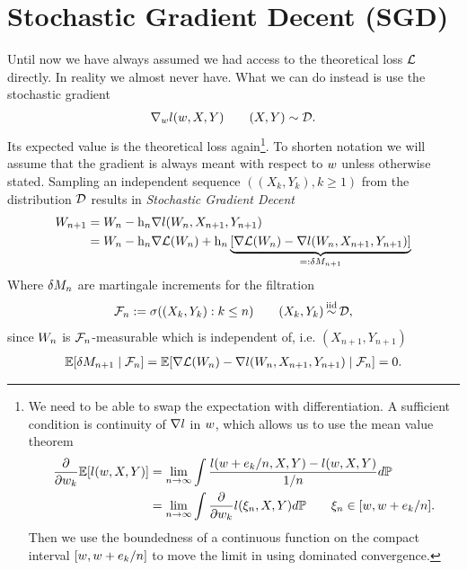 
\chapter{Stochastic Gradient Decent (SGD)}

Until now we have always assumed we had access to the theoretical loss \(\mathcal{L}\) 
directly. In reality we almost never have. What we can do instead is use the
stochastic gradient
%
\begin{align*}
	\nabla_wl (w, X,Y) \qquad (X,Y)\sim\mathcal{D}.
\end{align*}
%
Its expected value is the theoretical loss again\footnote{
	We need to be able to swap the expectation with differentiation. A sufficient 
	condition is continuity of \(\nabla l\) in \(w\), which allows us
	to use the mean value theorem
	\begin{align*}
		\frac{\partial}{\partial w_k}\mathbb{E}[l(w, X,Y)]
		&= \lim_{n\to\infty}
		\int\frac{l(w+e_k/n, X,Y)-l(w,X,Y)}{1/n}d\mathbb{P}
		\\
		&=\lim_{n\to\infty} \int\frac{\partial}{\partial w_k}l(\xi_n, X,Y)d\mathbb{P}
		\qquad \xi_n \in [w, w + e_k/n].
	\end{align*}
	Then we use the boundedness of a continuous function on the compact interval
	\([w, w + e_k/n]\) to move the limit in using
	dominated convergence.
}. To shorten notation we will assume that the gradient is always meant
with respect to \(w\) unless otherwise stated.
Sampling an independent sequence \(((X_k,Y_k), k\ge 1)\) from the 
distribution \(\mathcal{D}\) results in \emph{Stochastic Gradient Decent}
%
\begin{align*}
	W_{n+1}
	&= W_n - \text{h}_n\nabla l(W_n, X_{n+1},Y_{n+1})\\
	&= W_n - \text{h}_n\nabla\mathcal{L}(W_n)
	+ \text{h}_n\underbrace{
		[\nabla\mathcal{L}(W_n) - \nabla l(W_n, X_{n+1}, Y_{n+1})]
	}_{=:\delta M_{n+1}}
\end{align*}
Where \(\delta M_n\) are martingale increments for the filtration
\begin{align*}
	\filtration_n :=\sigma((X_k, Y_k): k\le n )
	\qquad (X_k,Y_k)\stackrel{\text{iid}}{\sim}\dist,
\end{align*}
since \(W_n\) is \(\mathcal{F}_n\)-measurable which is independent of, i.e.
\((X_{n+1},Y_{n+1})\)
\begin{align}\label{eq: conditional independence of martingale increments}
	\mathbb{E}[\delta M_{n+1}\mid \mathcal{F}_n]
	= \mathbb{E}[\nabla\mathcal{L}(W_n) - \nabla l(W_n, X_{n+1}, Y_{n+1})\mid \mathcal{F}_n]
	= 0.
\end{align}
%
